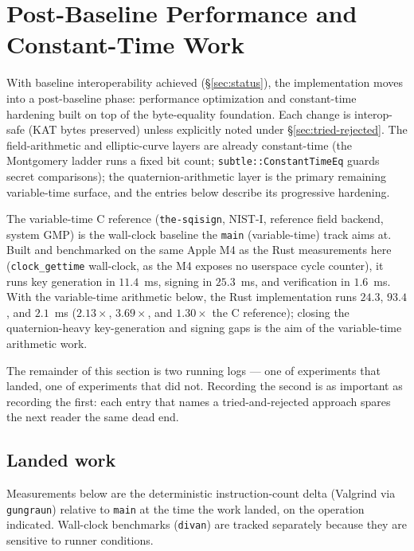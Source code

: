 \section{Post-Baseline Performance and Constant-Time Work}
\label{sec:post-baseline}

With baseline interoperability achieved (\S\ref{sec:status}), the
implementation moves into a post-baseline phase: performance
optimization and constant-time hardening built on top of the
byte-equality foundation.  Each change is interop-safe (KAT bytes
preserved) unless explicitly noted under
\S\ref{sec:tried-rejected}.  The field-arithmetic and elliptic-curve
layers are already constant-time (the Montgomery ladder runs a fixed
bit count; \texttt{subtle::ConstantTimeEq} guards secret comparisons);
the quaternion-arithmetic layer is the primary remaining variable-time
surface, and the entries below describe its progressive hardening.

The variable-time C reference (\texttt{the-sqisign}, NIST-I, reference
field backend, system GMP) is the wall-clock baseline the \texttt{main}
(variable-time) track aims at.  Built and benchmarked on the same Apple
M4 as the Rust measurements here (\texttt{clock\_gettime} wall-clock, as
the M4 exposes no userspace cycle counter), it runs key generation in
$11.4$~ms, signing in $25.3$~ms, and verification in $1.6$~ms.  With the
variable-time arithmetic below, the Rust implementation runs $24.3$,
$93.4$, and $2.1$~ms ($2.13\times$, $3.69\times$, and $1.30\times$ the C
reference); closing the quaternion-heavy key-generation and signing gaps
is the aim of the variable-time arithmetic work.

The remainder of this section is two running logs --- one of
experiments that landed, one of experiments that did not.  Recording
the second is as important as recording the first: each entry that
names a tried-and-rejected approach spares the next reader the same
dead end.

\subsection{Landed work}
\label{sec:perf-ct}

Measurements below are the deterministic instruction-count delta
(Valgrind via \texttt{gungraun}) relative to \texttt{main} at the time
the work landed, on the operation indicated.  Wall-clock benchmarks
(\texttt{divan}) are tracked separately because they are sensitive to
runner conditions.

